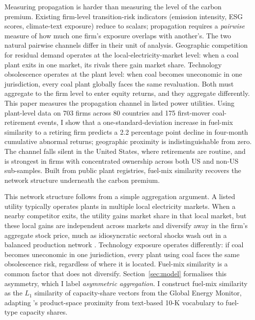 \documentclass[12pt,a4paper]{article}
\begin{document}
Measuring propagation is harder than measuring the level of the carbon premium. Existing firm-level transition-risk indicators (emission intensity, ESG scores, climate-text exposure) reduce to scalars; propagation requires a \emph{pairwise} measure of how much one firm's exposure overlaps with another's. The two natural pairwise channels differ in their unit of analysis. Geographic competition for residual demand operates at the local-electricity-market level: when a coal plant exits in one market, its rivals there gain market share. Technology obsolescence operates at the plant level: when coal becomes uneconomic in one jurisdiction, every coal plant globally faces the same revaluation. Both must aggregate to the firm level to enter equity returns, and they aggregate differently. This paper measures the propagation channel in listed power utilities. Using plant-level data on 703 firms across 80 countries and 175 first-mover coal-retirement events, I show that a one-standard-deviation increase in fuel-mix similarity to a retiring firm predicts a 2.2 percentage point decline in four-month cumulative abnormal returns; geographic proximity is indistinguishable from zero. The channel falls silent in the United States, where retirements are routine, and is strongest in firms with concentrated ownership across both US and non-US sub-samples. Built from public plant registries, fuel-mix similarity recovers the network structure underneath the carbon premium.

This network structure follows from a simple aggregation argument. A listed utility typically operates plants in multiple local electricity markets. When a nearby competitor exits, the utility gains market share in that local market, but these local gains are independent across markets and diversify away in the firm's aggregate stock price, much as idiosyncratic sectoral shocks wash out in a balanced production network \citep{AcemogluCarvalhoOzdaglarTahbazSalehi2012}. Technology exposure operates differently: if coal becomes uneconomic in one jurisdiction, every plant using coal faces the same obsolescence risk, regardless of where it is located. Fuel-mix similarity is a common factor that does not diversify. Section~\ref{sec:model} formalises this asymmetry, which I label \emph{asymmetric aggregation}. I construct fuel-mix similarity as the $L_1$ similarity of capacity-share vectors from the Global Energy Monitor, adapting \citet{HobergPhillips2016}'s product-space proximity from text-based 10-K vocabulary to fuel-type capacity shares.
\end{document}
